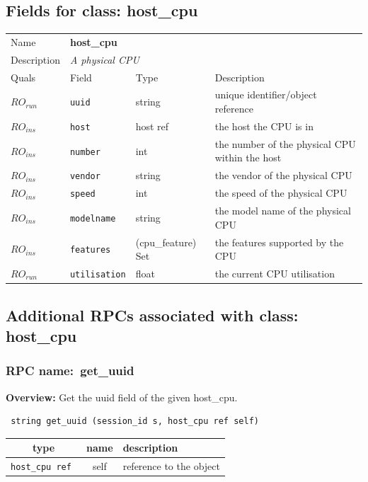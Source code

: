 \subsection{Fields for class: host\_cpu}
\begin{longtable}{|lllp{}|}
\hline
\multicolumn{1}{|l}{Name} & \multicolumn{3}{l|}{\bf host\_cpu} \\
\multicolumn{1}{|l}{Description} & \multicolumn{3}{l|}{\parbox{11cm}{\em A physical CPU}} \\
\hline
Quals & Field & Type & Description \\
\hline
$\mathit{RO}_\mathit{run}$ &  {\tt uuid} & string & unique identifier/object reference \\
$\mathit{RO}_\mathit{ins}$ &  {\tt host} & host ref & the host the CPU is in \\
$\mathit{RO}_\mathit{ins}$ &  {\tt number} & int & the number of the physical CPU within the host \\
$\mathit{RO}_\mathit{ins}$ &  {\tt vendor} & string & the vendor of the physical CPU \\
$\mathit{RO}_\mathit{ins}$ &  {\tt speed} & int & the speed of the physical CPU \\
$\mathit{RO}_\mathit{ins}$ &  {\tt modelname} & string & the model name of the physical CPU \\
$\mathit{RO}_\mathit{ins}$ &  {\tt features} & (cpu\_feature) Set & the features supported by the CPU \\
$\mathit{RO}_\mathit{run}$ &  {\tt utilisation} & float & the current CPU utilisation \\
\hline
\end{longtable}
\subsection{Additional RPCs associated with class: host\_cpu}
\subsubsection{RPC name:~get\_uuid}

{\bf Overview:} 
Get the uuid field of the given host\_cpu.

\begin{verbatim} string get_uuid (session_id s, host_cpu ref self)\end{verbatim}



 
\vspace{0.3cm}
\begin{tabular}{|c|c|p{7cm}|}
 \hline
{\bf type} & {\bf name} & {\bf description} \\ \hline
{\tt host\_cpu ref } & self & reference to the object \\ \hline 

\end{tabular}

